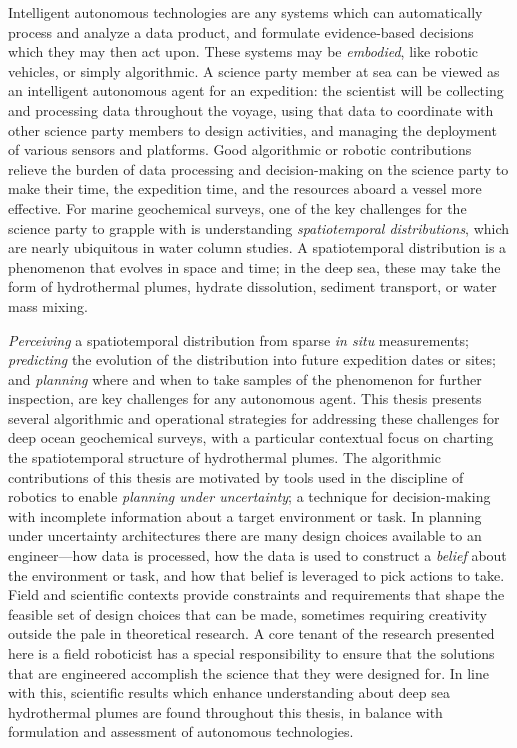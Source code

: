 Intelligent autonomous technologies are any systems which can automatically process and analyze a data product, and formulate evidence-based decisions which they may then act upon.
These systems may be \emph{embodied}, like robotic vehicles, or simply algorithmic.
A science party member at sea can be viewed as an intelligent autonomous agent for an expedition: the scientist will be collecting and processing data throughout the voyage, using that data to coordinate with other science party members to design activities, and managing the deployment of various sensors and platforms.
Good algorithmic or robotic contributions relieve the burden of data processing and decision-making on the science party to make their time, the expedition time, and the resources aboard a vessel more effective.
For marine geochemical surveys, one of the key challenges for the science party to grapple with is understanding \emph{spatiotemporal distributions}, which are nearly ubiquitous in water column studies.
A spatiotemporal distribution is a phenomenon that evolves in space and time; in the deep sea, these may take the form of hydrothermal plumes, hydrate dissolution, sediment transport, or water mass mixing.

\emph{Perceiving} a spatiotemporal distribution from sparse \emph{in situ} measurements; \emph{predicting} the evolution of the distribution into future expedition dates or sites; and \emph{planning} where and when to take samples of the phenomenon for further inspection, are key challenges for any autonomous agent.
This thesis presents several algorithmic and operational strategies for addressing these challenges for deep ocean geochemical surveys, with a particular contextual focus on charting the spatiotemporal structure of hydrothermal plumes.
The algorithmic contributions of this thesis are motivated by tools used in the discipline of robotics to enable \emph{planning under uncertainty}; a technique for decision-making with incomplete information about a target environment or task.
In planning under uncertainty architectures there are many design choices available to an engineer---how data is processed, how the data is used to construct a \emph{belief} about the environment or task, and how that belief is leveraged to pick actions to take.
Field and scientific contexts provide constraints and requirements that shape the feasible set of design choices that can be made, sometimes requiring creativity outside the pale in theoretical research.
A core tenant of the research presented here is a field roboticist has a special responsibility to ensure that the solutions that are engineered accomplish the science that they were designed for.
In line with this, scientific results which enhance understanding about deep sea hydrothermal plumes are found throughout this thesis, in balance with formulation and assessment of autonomous technologies.

